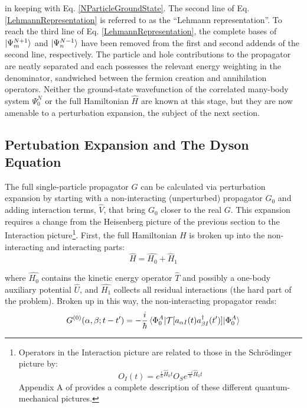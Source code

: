 \noindent
in keeping with Eq. \ref{NParticleGroundState}. The second line
of Eq. \ref{LehmannRepresentation} is referred to as the ``Lehmann representation''.
To reach the third line of Eq. \ref{LehmannRepresentation}, the complete bases of
$\ket{\Psi^{N+1}_{m}}$ and $\ket{\Psi^{N-1}_{n}}$ have been removed from the first and second 
addends of the second line, respectively.
The particle and hole contributions to the propagator are neatly separated and
each possesses the relevant energy weighting in the denominator, sandwiched between the fermion 
creation and annihilation operators. Neither the ground-state wavefunction of the correlated
many-body system $\Psi^{N}_{0}$ or the full Hamiltonian $\hat{H}$ are known at this stage, but they
are now amenable to a perturbation expansion, the subject of the next section.

\subsection{Pertubation Expansion and The Dyson Equation}
The full single-particle propagator $G$ can be calculated via perturbation
expansion by starting with a non-interacting (unperturbed) propagator $G_{0}$
and adding interaction 
terms, $\hat{V}$, that bring $G_{0}$ closer to the real $G$. This expansion requires a change from
the Heisenberg picture of the previous section to the Interaction picture\footnote{Operators in the
    Interaction picture are related to those in the Schr\"odinger picture by:
    \begin{equation*}
        O_{I}(t) = e^{\frac{i}{\hbar}\hat{H}_{0}t}O_{S}e^{\frac{-i}{\hbar}\hat{H}_{0}t}
    \end{equation*}
    Appendix A of \cite{MBTE} provides a complete description of these different quantum-mechanical
pictures.}. First, the full Hamiltonian $H$ is broken up into the non-interacting and interacting
parts:
\begin{equation}
    \hat{H} = \hat{H_{0}}+\hat{H}_{1}
\end{equation}

\noindent
where $\hat{H_{0}}$ contains the kinetic energy operator $\hat{T}$ and possibly a one-body auxiliary
potential $\hat{U}$, and $\hat{H_{1}}$ collects all residual interactions (the hard part of the
problem). Broken up in this way, the non-interacting propagator reads:
\begin{equation}
    G^{(0)}(\alpha, \beta; t-t') =
    -\frac{i}{\hbar}\braket{\Phi^{A}_{0}|
    \mathcal{T}[a_{\alpha I}(t)a^{\dagger}_{\beta I}(t')]|\Phi^{A}_{0}}
\end{equation}

